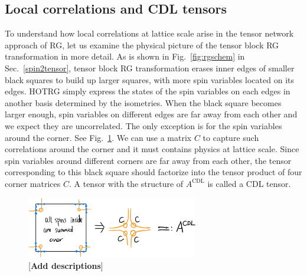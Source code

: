 \documentclass[aps,prb,reprint,superscriptaddress]{revtex4-2}
\begin{document}
\subsection{Local correlations and CDL tensors\label{CDLten}}
To understand how local correlations at lattice scale arise in the
tensor network approach of RG, let us examine the physical picture of
the tensor block RG transformation in more detail. As is shown in
Fig.~\ref{fig:rgschem} in Sec.~\ref{spin2tensor}, tensor block RG
transformation erases inner edges of smaller black squares to build up
larger squares, with more spin variables located on its edges. HOTRG
simply express the states of the spin variables on each edges in another
basis determined by the isometries. When the black square becomes larger
enough, spin variables on different edges are far away from each other
and we expect they are uncorrelated. The only exception is for the spin
variables around the corner. See Fig.~\ref{fig:ariseCDL}. We can use a
matrix $C$ to capture such correlations around the corner and it must
contains physics at lattice scale. Since spin variables around different
corners are far away from each other, the tensor corresponding to this
black square should factorize into the tensor product of four corner
matrices $C$. A tensor with the structure of $A^{\text{CDL}}$ is called
a CDL tensor.
%
\begin{figure}[h]
    \includegraphics[width=7.5cm]{./figs/ariseCDL}
    \caption{\label{fig:ariseCDL}[\textbf{Add descriptions}]}
\end{figure}
%
\end{document}
